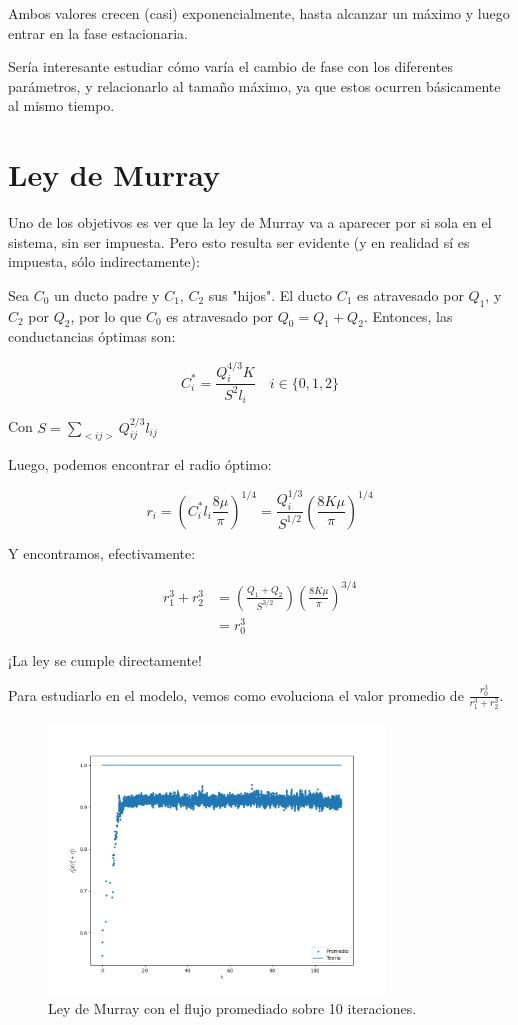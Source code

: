 \documentclass{article}
\begin{document}
Ambos valores crecen (casi) exponencialmente, hasta alcanzar un máximo y luego entrar en la fase estacionaria.

Sería interesante estudiar cómo varía el cambio de fase con los diferentes parámetros, y relacionarlo al tamaño máximo, ya que estos ocurren básicamente al mismo tiempo.
\section{Ley de Murray}

Uno de los objetivos es ver que la ley de Murray va a aparecer por si sola en el sistema, sin ser impuesta. Pero esto resulta ser evidente (y en realidad sí es impuesta, sólo indirectamente):

Sea $C_0$ un ducto padre y $C_1$, $C_2$ sus "hijos". El ducto $C_1$ es atravesado por $Q_1$, y $C_2$ por $Q_2$, por lo que $C_0$ es atravesado por $Q_0 = Q_1 + Q_2$. Entonces, las conductancias óptimas son:

$$ C_i^* = \frac{Q_i^{4/3} K}{S^2 l_i} \quad i\in\{0,1,2\} $$

Con $ S = \sum_{<ij>}Q_{ij}^{2/3}l_{ij} $

Luego, podemos encontrar el radio óptimo:

$$ r_i = \left( C_i^* l_i \frac{8 \mu}{\pi} \right)^{1/4} = \frac{Q_i^{1/3}}{S^{1/2}}\left(\frac{8K\mu}{\pi}\right)^{1/4}$$

Y encontramos, efectivamente:

\begin{align*}
    r_1^3 + r_2^3 & = \left(\frac{Q_1 + Q_2}{S^{3/2}}\right)\left(\frac{8K\mu}{\pi}\right)^{3/4} \\
    & = r_0^3
\end{align*}

¡La ley se cumple directamente!

Para estudiarlo en el modelo, vemos como evoluciona el valor promedio de $\frac{r_0^3}{r_1^3+r_2^3}$.

\begin{figure}[h!]
    \centering
    \includegraphics[width=0.8\textwidth]{graficos_inst/murray_feo.png}
    \caption{Ley de Murray con el flujo promediado sobre 10 iteraciones.}
    \label{fig:murray_feo}
\end{figure}
\end{document}
